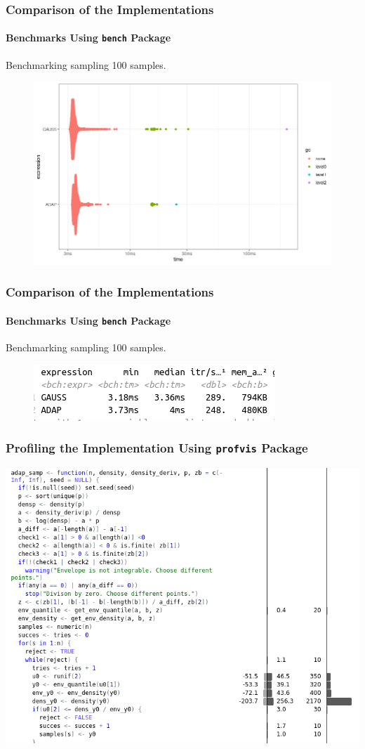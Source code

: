 \documentclass[aspectratio=169]{beamer}
\begin{document}
\begin{frame}
  \frametitle{Comparison of the Implementations}
  \framesubtitle{Benchmarks Using \texttt{bench} Package}
  Benchmarking sampling 100 samples.
  \begin{figure}
    \centering
    \includegraphics[scale = 0.4]{figure/GaussVsAdapPlot.png}
  \end{figure}
\end{frame}
\begin{frame}
  \frametitle{Comparison of the Implementations}
  \framesubtitle{Benchmarks Using \texttt{bench} Package}
  Benchmarking sampling 100 samples.
  \begin{figure}
    \centering
    \includegraphics[scale = 0.6]{figure/AdapVsAdapTable.png}
  \end{figure}
\end{frame}
\begin{frame}
  \frametitle{Profiling the Implementation Using \texttt{profvis} Package}
  \centering
  \includegraphics[scale = 0.4]{figure/ProfileBody.png}
\end{frame}
\end{document}
